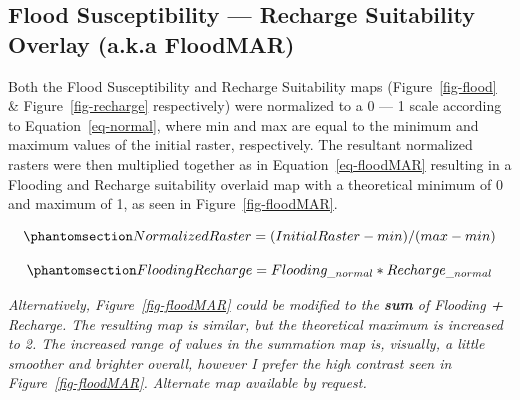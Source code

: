 \documentclass[
]{agujournal2019}
\begin{document}
\subsection{Flood Susceptibility --- Recharge Suitability Overlay (a.k.a
FloodMAR)}\label{flood-susceptibility-recharge-suitability-overlay-a.k.a-floodmar}

Both the Flood Susceptibility and Recharge Suitability maps
(Figure~\ref{fig-flood} \& Figure~\ref{fig-recharge} respectively) were
normalized to a 0 --- 1 scale according to Equation~\ref{eq-normal},
where min and max are equal to the minimum and maximum values of the
initial raster, respectively. The resultant normalized rasters were then
multiplied together as in Equation~\ref{eq-floodMAR} resulting in a
Flooding and Recharge suitability overlaid map with a theoretical
minimum of 0 and maximum of 1, as seen in Figure~\ref{fig-floodMAR}.

\begin{equation}\phantomsection\label{eq-normal}{
Normalized Raster = (Initial Raster - min)/(max - min)
}\end{equation}

\begin{equation}\phantomsection\label{eq-floodMAR}{
Flooding Recharge = Flooding_{\_normal} * Recharge_{\_normal}
}\end{equation}

\begin{tcolorbox}[enhanced jigsaw, opacitybacktitle=0.6, opacityback=0, coltitle=black, colframe=quarto-callout-note-color-frame, bottomtitle=1mm, rightrule=.15mm, bottomrule=.15mm, colback=white, leftrule=.75mm, left=2mm, colbacktitle=quarto-callout-note-color!10!white, arc=.35mm, toptitle=1mm, titlerule=0mm, title=\textcolor{quarto-callout-note-color}{\faInfo}\hspace{0.5em}{Note}, toprule=.15mm, breakable]

\emph{Alternatively, Figure~\ref{fig-floodMAR} could be modified to the
\textbf{sum} of Flooding \textbf{+} Recharge. The resulting map is
similar, but the theoretical maximum is increased to 2. The increased
range of values in the summation map is, visually, a little smoother and
brighter overall, however I prefer the high contrast seen in
Figure~\ref{fig-floodMAR}. Alternate map available by request.}

\end{tcolorbox}
\end{document}
